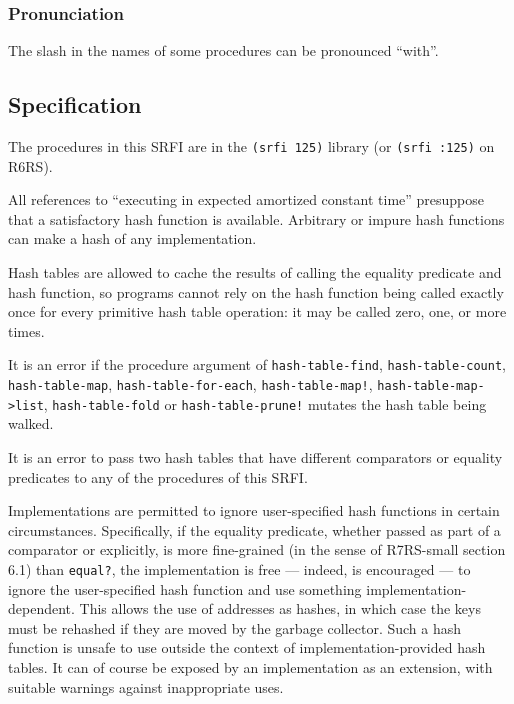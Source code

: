 

\subsubsection{Pronunciation}\label{Pronunciation}

The slash in the names of some procedures can be pronounced ``with''.

\subsection{Specification}\label{specification}

The procedures in this SRFI are in the \texttt{(srfi\ 125)} library (or
\texttt{(srfi\ :125)} on R6RS).

All references to ``executing in expected amortized constant time''
presuppose that a satisfactory hash function is available. Arbitrary or
impure hash functions can make a hash of any implementation.

Hash tables are allowed to cache the results of calling the equality
predicate and hash function, so programs cannot rely on the hash
function being called exactly once for every primitive hash table
operation: it may be called zero, one, or more times.

It is an error if the procedure argument of \texttt{hash-table-find},
\texttt{hash-table-count}, \texttt{hash-table-map},
\texttt{hash-table-for-each}, \texttt{hash-table-map!},
\texttt{hash-table-map-\textgreater{}list}, \texttt{hash-table-fold} or
\texttt{hash-table-prune!} mutates the hash table being walked.

It is an error to pass two hash tables that have different comparators
or equality predicates to any of the procedures of this SRFI.

Implementations are permitted to ignore user-specified hash functions in
certain circumstances. Specifically, if the equality predicate, whether
passed as part of a comparator or explicitly, is more fine-grained (in
the sense of R7RS-small section 6.1) than \texttt{equal?}, the
implementation is free --- indeed, is encouraged --- to ignore the
user-specified hash function and use something implementation-dependent.
This allows the use of addresses as hashes, in which case the keys must
be rehashed if they are moved by the garbage collector. Such a hash
function is unsafe to use outside the context of implementation-provided
hash tables. It can of course be exposed by an implementation as an
extension, with suitable warnings against inappropriate uses.

